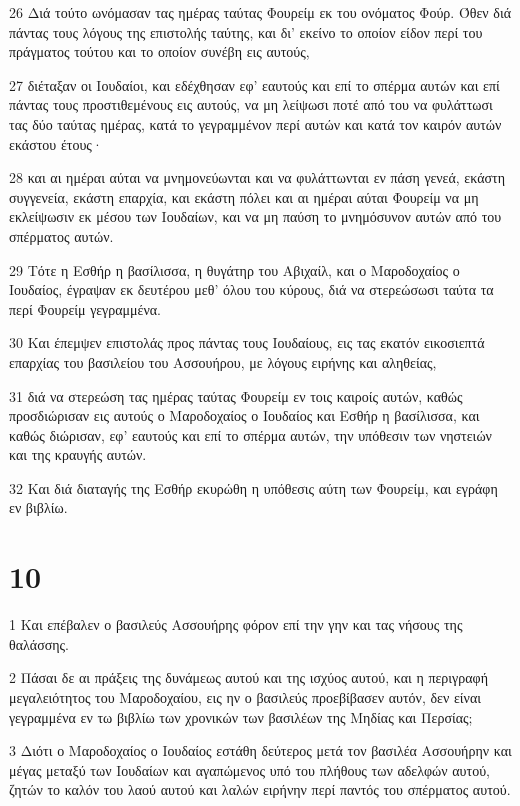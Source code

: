 \par 26 Διά τούτο ωνόμασαν τας ημέρας ταύτας Φουρείμ εκ του ονόματος Φούρ. Όθεν διά πάντας τους λόγους της επιστολής ταύτης, και δι' εκείνο το οποίον είδον περί του πράγματος τούτου και το οποίον συνέβη εις αυτούς,
\par 27 διέταξαν οι Ιουδαίοι, και εδέχθησαν εφ' εαυτούς και επί το σπέρμα αυτών και επί πάντας τους προστιθεμένους εις αυτούς, να μη λείψωσι ποτέ από του να φυλάττωσι τας δύο ταύτας ημέρας, κατά το γεγραμμένον περί αυτών και κατά τον καιρόν αυτών εκάστου έτους·
\par 28 και αι ημέραι αύται να μνημονεύωνται και να φυλάττωνται εν πάση γενεά, εκάστη συγγενεία, εκάστη επαρχία, και εκάστη πόλει και αι ημέραι αύται Φουρείμ να μη εκλείψωσιν εκ μέσου των Ιουδαίων, και να μη παύση το μνημόσυνον αυτών από του σπέρματος αυτών.
\par 29 Τότε η Εσθήρ η βασίλισσα, η θυγάτηρ του Αβιχαίλ, και ο Μαροδοχαίος ο Ιουδαίος, έγραψαν εκ δευτέρου μεθ' όλου του κύρους, διά να στερεώσωσι ταύτα τα περί Φουρείμ γεγραμμένα.
\par 30 Και έπεμψεν επιστολάς προς πάντας τους Ιουδαίους, εις τας εκατόν εικοσιεπτά επαρχίας του βασιλείου του Ασσουήρου, με λόγους ειρήνης και αληθείας,
\par 31 διά να στερεώση τας ημέρας ταύτας Φουρείμ εν τοις καιροίς αυτών, καθώς προσδιώρισαν εις αυτούς ο Μαροδοχαίος ο Ιουδαίος και Εσθήρ η βασίλισσα, και καθώς διώρισαν, εφ' εαυτούς και επί το σπέρμα αυτών, την υπόθεσιν των νηστειών και της κραυγής αυτών.
\par 32 Και διά διαταγής της Εσθήρ εκυρώθη η υπόθεσις αύτη των Φουρείμ, και εγράφη εν βιβλίω.

\chapter{10}

\par 1 Και επέβαλεν ο βασιλεύς Ασσουήρης φόρον επί την γην και τας νήσους της θαλάσσης.
\par 2 Πάσαι δε αι πράξεις της δυνάμεως αυτού και της ισχύος αυτού, και η περιγραφή μεγαλειότητος του Μαροδοχαίου, εις ην ο βασιλεύς προεβίβασεν αυτόν, δεν είναι γεγραμμένα εν τω βιβλίω των χρονικών των βασιλέων της Μηδίας και Περσίας;
\par 3 Διότι ο Μαροδοχαίος ο Ιουδαίος εστάθη δεύτερος μετά τον βασιλέα Ασσουήρην και μέγας μεταξύ των Ιουδαίων και αγαπώμενος υπό του πλήθους των αδελφών αυτού, ζητών το καλόν του λαού αυτού και λαλών ειρήνην περί παντός του σπέρματος αυτού.


